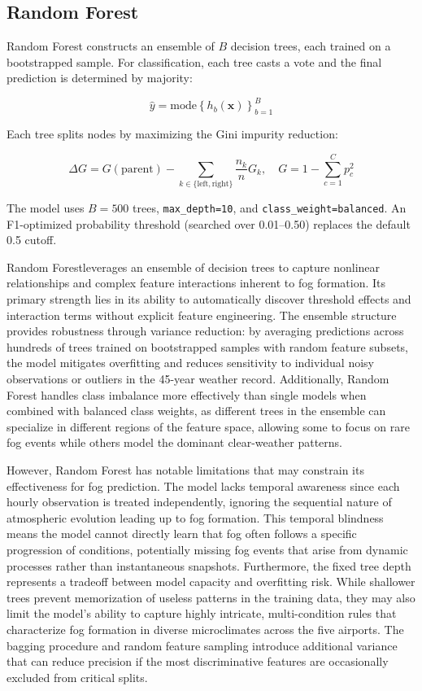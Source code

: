 \documentclass[
  letterpaper,
  DIV=11,
  numbers=noendperiod]{scrartcl}
\begin{document}
\subsection{Random Forest}\label{random-forest}

Random Forest constructs an ensemble of \(B\) decision trees, each
trained on a bootstrapped sample. For classification, each tree casts a
vote and the final prediction is determined by majority:

\[\hat{y} = \text{mode}\left\{ h_b(\mathbf{x}) \right\}_{b=1}^{B}\]

Each tree splits nodes by maximizing the Gini impurity reduction:

\[\Delta G = G(\text{parent}) - \sum_{k \in \{\text{left}, \text{right}\}} \frac{n_k}{n} G_k, \quad G = 1 - \sum_{c=1}^{C} p_c^2\]

The model uses \(B = 500\) trees, \texttt{max\_depth=10}, and
\texttt{class\_weight=\textquotesingle{}balanced\textquotesingle{}}. An
F1-optimized probability threshold (searched over 0.01--0.50) replaces
the default 0.5 cutoff.

Random Forestleverages an ensemble of decision trees to capture
nonlinear relationships and complex feature interactions inherent to fog
formation. Its primary strength lies in its ability to automatically
discover threshold effects and interaction terms without explicit
feature engineering. The ensemble structure provides robustness through
variance reduction: by averaging predictions across hundreds of trees
trained on bootstrapped samples with random feature subsets, the model
mitigates overfitting and reduces sensitivity to individual noisy
observations or outliers in the 45-year weather record. Additionally,
Random Forest handles class imbalance more effectively than single
models when combined with balanced class weights, as different trees in
the ensemble can specialize in different regions of the feature space,
allowing some to focus on rare fog events while others model the
dominant clear-weather patterns.

However, Random Forest has notable limitations that may constrain its
effectiveness for fog prediction. The model lacks temporal awareness
since each hourly observation is treated independently, ignoring the
sequential nature of atmospheric evolution leading up to fog formation.
This temporal blindness means the model cannot directly learn that fog
often follows a specific progression of conditions, potentially missing
fog events that arise from dynamic processes rather than instantaneous
snapshots. Furthermore, the fixed tree depth represents a tradeoff
between model capacity and overfitting risk. While shallower trees
prevent memorization of useless patterns in the training data, they may
also limit the model's ability to capture highly intricate,
multi-condition rules that characterize fog formation in diverse
microclimates across the five airports. The bagging procedure and random
feature sampling introduce additional variance that can reduce precision
if the most discriminative features are occasionally excluded from
critical splits.
\end{document}
